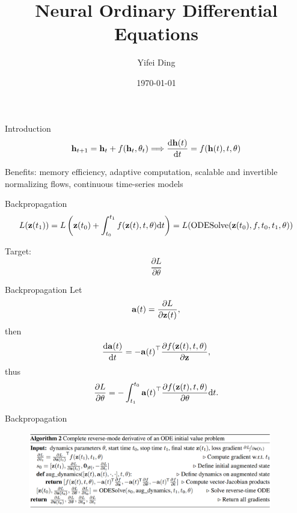 \documentclass[12pt,aspectratio=169]{beamer}
\title{Neural Ordinary Differential Equations}
\subtitle{}
\author{Yifei Ding}
\date{\today}
\begin{document}
\maketitle

\begin{frame}{Introduction}
  \[
    \textbf{\textrm{h}}_{t+1}=\textbf{\textrm{h}}_t+f(\textbf{\textrm{h}}_t,\theta_t)
    \Longrightarrow
    \frac{\textrm{d}\textbf{\textrm{h}}(t)}{\textrm{d}t}=f(\textbf{\textrm{h}}(t),t,\theta)
  \]

  \vspace{1cm}

  Benefits: memory efficiency, adaptive computation, scalable and invertible
  normalizing flows, continuous time-series models
\end{frame}

\begin{frame}{Backpropagation}
  \[
    L(\textbf{\textrm{z}}(t_1))=L\left(\textbf{\textrm{z}}(t_0)+\int_{t_0}^{t_1}
    f(\textbf{\textrm{z}}(t),t,\theta)\textrm{d}t\right)=L(\textrm{ODESolve}
    (\textbf{\textrm{z}}(t_0),f,t_0,t_1,\theta))
  \]

  \vspace{1cm}

  Target:
  \[\frac{\partial L}{\partial \theta}\]
\end{frame}

\begin{frame}{Backpropagation}
  Let
  \[
    \textbf{\textrm{a}}(t)=\frac{\partial L}{\partial \textbf{\textrm{z}}(t)},
  \]
  then
  \[
    \frac{\textrm{d}\textbf{\textrm{a}}(t)}{\textrm{d}t}=
    -\textbf{\textrm{a}}{(t)}^\top\frac{\partial f(\textbf{\textrm{z}}(t),t,\theta)}
    {\partial\textbf{\textrm{z}}},
  \]
  thus
  \[
    \frac{\partial L}{\partial \theta}=-\int_{t_1}^{t_0}
    \textbf{\textrm{a}}{(t)}^\top\frac{\partial f(\textbf{\textrm{z}}(t),t,\theta)}
    {\partial \theta}\textrm{d}t.
  \]
\end{frame}

\begin{frame}{Backpropagation}
  \begin{figure}
    \begin{center}
      \includegraphics[width=0.95\textwidth]{figures/Algorithm.png}
    \end{center}
  \end{figure}
\end{frame}
\end{document}
